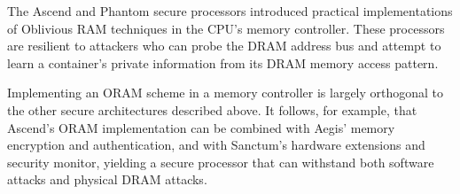
The Ascend \cite{fletcher2012ascend} and Phantom \cite{maas2013phantom} secure
processors introduced practical implementations of Oblivious RAM
\cite{goldreich1987oram} techniques in the CPU's memory controller. These
processors are resilient to attackers who can probe the DRAM address bus and
attempt to learn a container's private information from its DRAM memory access
pattern.

Implementing an ORAM scheme in a memory controller is largely orthogonal to the
other secure architectures described above. It follows, for example, that
Ascend's ORAM implementation can be combined with Aegis' memory encryption and
authentication, and with Sanctum's hardware extensions and security monitor,
yielding a secure processor that can withstand both software attacks and
physical DRAM attacks.
